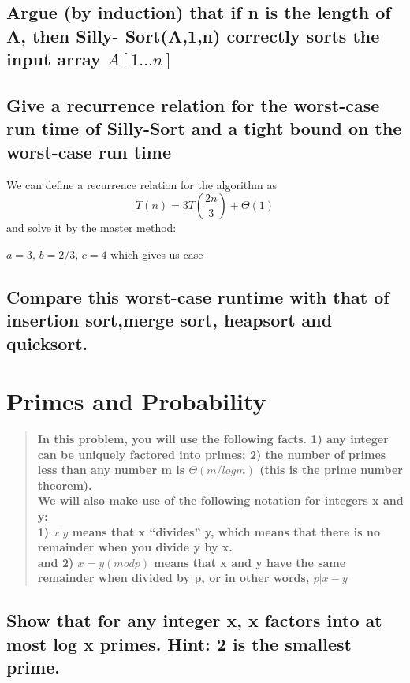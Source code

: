 \documentclass[titlepage]{article}\usepackage[]{graphicx}\usepackage[]{color}
\begin{document}
\subsection{ Argue (by induction) that if n is the
length of A, then Silly- Sort(A,1,n)
correctly sorts the input array
$A[1\dots n]$}


\subsection{ Give a recurrence relation for the worst-case run time of Silly-Sort and a
tight bound on the worst-case run time}

We can define a recurrence relation for the algorithm as 
\[ T(n) = 3T(\frac{2n}{3}) + \Theta(1) \]
and solve it by the master method:

$a = 3, \, b = 2/3, \, c=4$ which gives us case 


\subsection{ Compare this worst-case runtime with that of insertion sort,merge
sort, heapsort and quicksort.}





\section{Primes and Probability}

\begin{quote}
	\textbf{
In this problem, you will use the following facts. 1) any integer can be
uniquely factored into primes; 2) the number of primes less than any number m
is $\Theta(m/ log m)$ (this is the prime number theorem). \\
We will also make use of the following notation for integers x and y: \\
1) $x|y$ means that x ``divides'' y, which means that there is no remainder
when you divide y by x. \\ 
and 2) $ x = y(modp)$ means that x and y have the same remainder when
divided by p, or in other words, $p|x−y$} 
\end{quote}

\subsection{Show that for any integer x, x factors into at most log x primes. Hint: 2 is
the smallest prime.}
\end{document}
